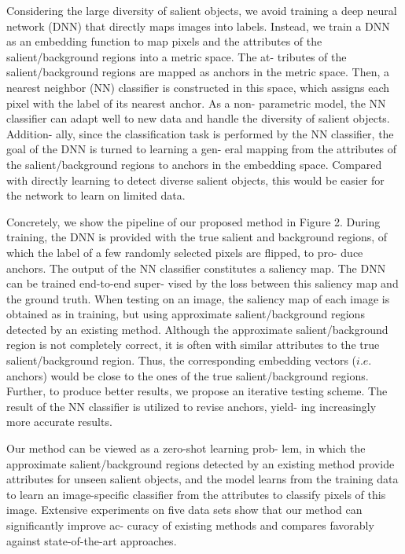 \documentclass[a4paper,10pt]{article}
\begin{document}
Considering the large diversity of salient objects, we avoid training a deep neural network (DNN) that directly maps images into labels. Instead, we train a DNN as an embedding function to map pixels and the attributes of the salient/background regions into a metric space. The at- tributes of the salient/background regions are mapped as anchors in the metric space. Then, a nearest neighbor (NN) classifier is constructed in this space, which assigns each pixel with the label of its nearest anchor. As a non- parametric model, the NN classifier can adapt well to new data and handle the diversity of salient objects. Addition- ally, since the classification task is performed by the NN classifier, the goal of the DNN is turned to learning a gen- eral mapping from the attributes of the salient/background regions to anchors in the embedding space. Compared with directly learning to detect diverse salient objects, this would be easier for the network to learn on limited data.

Concretely, we show the pipeline of our proposed method in Figure 2. During training, the DNN is provided with the true salient and background regions, of which the label of a few randomly selected pixels are flipped, to pro- duce anchors. The output of the NN classifier constitutes a saliency map. The DNN can be trained end-to-end super- vised by the loss between this saliency map and the ground truth. When testing on an image, the saliency map of each image is obtained as in training, but using approximate salient/background regions detected by an existing method. Although the approximate salient/background region is not completely correct, it is often with similar attributes to the true salient/background region. Thus, the corresponding embedding vectors ($i.e$. anchors) would be close to the ones of the true salient/background regions. Further, to produce better results, we propose an iterative testing scheme. The result of the NN classifier is utilized to revise anchors, yield- ing increasingly more accurate results.

Our method can be viewed as a zero-shot learning prob- lem, in which the approximate salient/background regions detected by an existing method provide attributes for unseen salient objects, and the model learns from the training data to learn an image-specific classifier from the attributes to classify pixels of this image. Extensive experiments on five data sets show that our method can significantly improve ac- curacy of existing methods and compares favorably against state-of-the-art approaches.
\end{document}
